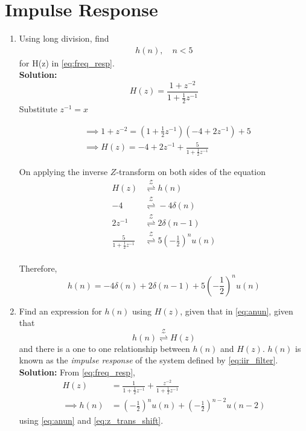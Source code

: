 \documentclass[journal,12pt,twocolumn]{IEEEtran}
\newcommand{\solution}{\noindent \textbf{Solution: }}
\providecommand{\brak}[1]{\ensuremath{\left(#1\right)}}
\providecommand{\ztrans}{\overset{\mathcal{Z}}{ \rightleftharpoons}}
\numberwithin{equation}{section}
\renewcommand\thesection{\arabic{section}}
\begin{document}
\section{Impulse Response}
\begin{enumerate}[label=\thesection.\arabic*]
\item Using long division, 
find
		\begin{align}
			h(n), \quad n < 5
		\end{align}
		for H(z) in 
		\eqref{eq:freq_resp}.\\
\solution 
	\begin{equation}
		H(z) = \frac{1 + z^{-2}}{1 + \frac12 z^{-1}}
	\end{equation}
	Substitute $z^{-1} = x$
	
	\begin{align}
		&\implies 1 + z^{-2} = \brak{1 + \frac12 z^{-1}}\brak{-4 + 2z^{-1}} + 5 \\
		&\implies H(z) = -4 + 2z^{-1} + \frac{5}{1 + \frac12 z^{-1}}
	\end{align}
	
	On applying the inverse $Z$-transform on both sides of the equation
	\begin{align}
		H(z) &\ztrans h(n) \\
		-4 &\ztrans -4\delta(n) \\
		2z^{-1} &\ztrans 2\delta(n - 1) \\
		\frac{5}{1 + \frac12 z^{-1}} &\ztrans 5\brak{-\frac12}^n u(n) \\
	\end{align}
	
	Therefore,
	\begin{equation}
		h(n) = -4\delta(n) + 2\delta(n - 1) + 5\brak{-\frac12}^n u(n)
	\end{equation}
\item \label{prob:impulse_resp}
Find an expression for $h(n)$ using $H(z)$, given that 
in \eqref{eq:anun}, given that
\begin{equation}
\label{eq:impulse_resp}
h(n) \ztrans H(z)
\end{equation}
and there is a one to one relationship between $h(n)$ and $H(z)$. $h(n)$ is known as the {\em impulse response} of the
system defined by \eqref{eq:iir_filter}.
\\
\solution From \eqref{eq:freq_resp},
\begin{align}
H(z) &= \frac{1}{1 + \frac{1}{2}z^{-1}} + \frac{ z^{-2}}{1 + \frac{1}{2}z^{-1}}
\\
\implies h(n) &= \brak{-\frac{1}{2}}^{n}u(n) + \brak{-\frac{1}{2}}^{n-2}u(n-2)
\end{align}
using \eqref{eq:anun} and \eqref{eq:z_trans_shift}.


\end{enumerate}
\end{document}
